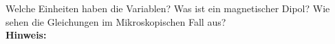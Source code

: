 \begin{question}[section=2,subsection=22,name={Polerisation und Magnetisierung},difficulty=4,type=mdl,mode=exm,tags={}]
	Welche Einheiten haben die Variablen? Was ist ein magnetischer Dipol? Wie sehen die Gleichungen im Mikroskopischen Fall aus?
	\\ \textbf{Hinweis:}\\
	
\end{question}
\begin{solution}
	
\end{solution}